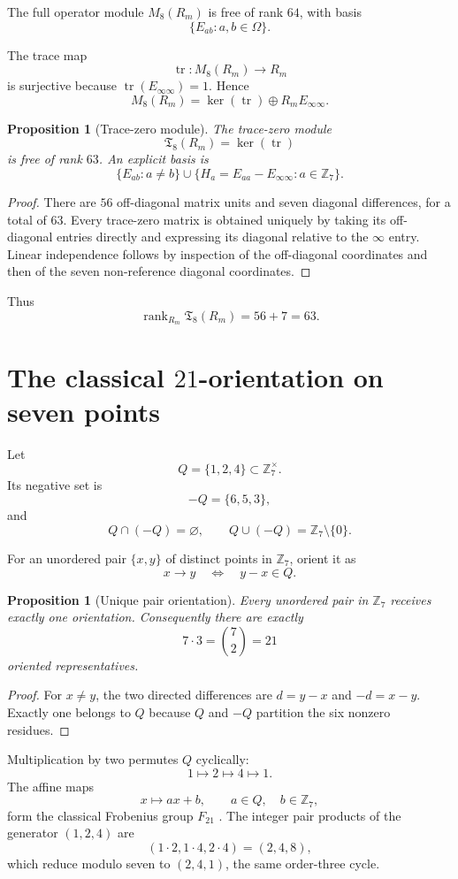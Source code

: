\documentclass[11pt]{article}
\newtheorem{proposition}[theorem]{Proposition}
\theoremstyle{definition}
\newcommand{\Z}{\mathbb Z}
\newcommand{\tr}{\operatorname{tr}}
\begin{document}
The full operator module $M_8(R_m)$ is free of rank $64$, with basis
\[
\{E_{ab}:a,b\in\Omega\}.
\]

The trace map
\[
\tr:M_8(R_m)\to R_m
\]
is surjective because $\tr(E_{\infty\infty})=1$. Hence
\[
M_8(R_m)=\ker(\tr)\oplus R_m E_{\infty\infty}.
\]

\begin{proposition}[Trace-zero module]\label{prop:tracezero}
The trace-zero module
\[
\mathfrak T_8(R_m)=\ker(\tr)
\]
is free of rank $63$. An explicit basis is
\[
\{E_{ab}:a\ne b\}
\cup
\{H_a=E_{aa}-E_{\infty\infty}:a\in\Z_7\}.
\]
\end{proposition}

\begin{proof}
There are $56$ off-diagonal matrix units and seven diagonal differences, for a total of $63$. Every trace-zero matrix is obtained uniquely by taking its off-diagonal entries directly and expressing its diagonal relative to the $\infty$ entry. Linear independence follows by inspection of the off-diagonal coordinates and then of the seven non-reference diagonal coordinates.
\end{proof}

Thus
\[
\operatorname{rank}_{R_m}\mathfrak T_8(R_m)=56+7=63.
\]

\section{The classical $21$-orientation on seven points}
Let
\[
Q=\{1,2,4\}\subset\Z_7^\times.
\]
Its negative set is
\[
-Q=\{6,5,3\},
\]
and
\[
Q\cap(-Q)=\varnothing,\qquad Q\cup(-Q)=\Z_7\setminus\{0\}.
\]

For an unordered pair $\{x,y\}$ of distinct points in $\Z_7$, orient it as
\[
x\longrightarrow y
\quad\Longleftrightarrow\quad
y-x\in Q.
\]

\begin{proposition}[Unique pair orientation]\label{prop:orientation}
Every unordered pair in $\Z_7$ receives exactly one orientation. Consequently there are exactly
\[
7\cdot3=\binom72=21
\]
oriented representatives.
\end{proposition}

\begin{proof}
For $x\ne y$, the two directed differences are $d=y-x$ and $-d=x-y$. Exactly one belongs to $Q$ because $Q$ and $-Q$ partition the six nonzero residues.
\end{proof}

Multiplication by two permutes $Q$ cyclically:
\[
1\mapsto2\mapsto4\mapsto1.
\]
The affine maps
\[
x\mapsto ax+b,\qquad a\in Q,\quad b\in\Z_7,
\]
form the classical Frobenius group $F_{21}$ \cite{CostaPavone2024}. The integer pair products of the generator $(1,2,4)$ are
\[
(1\cdot2,1\cdot4,2\cdot4)=(2,4,8),
\]
which reduce modulo seven to $(2,4,1)$, the same order-three cycle.
\end{document}
